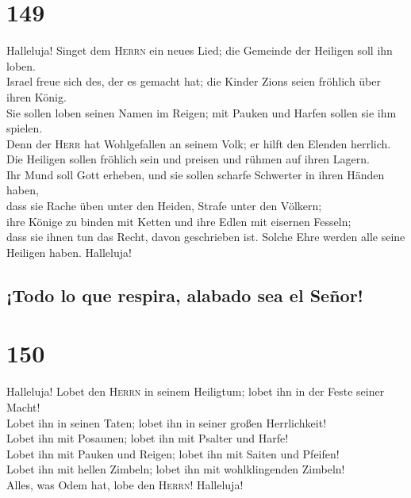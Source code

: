 \hypertarget{section-148}{%
\section{149}\label{section-148}}

 Halleluja! Singet dem \textsc{Herrn} ein neues Lied; die
Gemeinde der Heiligen soll ihn loben.\\
 Israel freue sich des, der es gemacht hat; die Kinder
Zions seien fröhlich über ihren König.\\
 Sie sollen loben seinen Namen im Reigen; mit Pauken und
Harfen sollen sie ihm spielen.\\
 Denn der \textsc{Herr} hat Wohlgefallen an seinem Volk;
er hilft den Elenden herrlich.\\
 Die Heiligen sollen fröhlich sein und preisen und rühmen
auf ihren Lagern.\\
 Ihr Mund soll Gott erheben, und sie sollen scharfe
Schwerter in ihren Händen haben,\\
 dass sie Rache üben unter den Heiden, Strafe unter den
Völkern;\\
 ihre Könige zu binden mit Ketten und ihre Edlen mit
eisernen Fesseln;\\
 dass sie ihnen tun das Recht, davon geschrieben ist.
Solche Ehre werden alle seine Heiligen haben. Halleluja!

\hypertarget{todo-lo-que-respira-alabado-sea-el-seuxf1or}{%
\subsection{¡Todo lo que respira, alabado sea el
Señor!}\label{todo-lo-que-respira-alabado-sea-el-seuxf1or}}

\hypertarget{section-149}{%
\section{150}\label{section-149}}

 Halleluja! Lobet den \textsc{Herrn} in seinem Heiligtum;
lobet ihn in der Feste seiner Macht!\\
 Lobet ihn in seinen Taten; lobet ihn in seiner großen
Herrlichkeit!\\
 Lobet ihn mit Posaunen; lobet ihn mit Psalter und
Harfe!\\
 Lobet ihn mit Pauken und Reigen; lobet ihn mit Saiten und
Pfeifen!\\
 Lobet ihn mit hellen Zimbeln; lobet ihn mit
wohlklingenden Zimbeln!\\
 Alles, was Odem hat, lobe den \textsc{Herrn}! Halleluja!
